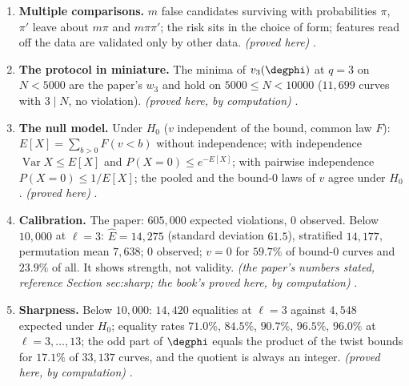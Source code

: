 \begin{enumerate}[label=\textbf{\thechapter.\arabic*}]
fixed before the hold-out counts of (eq:main) were seen; the Euler terms blind-tested only on the out-of-table curves; the weights $w_3$ only on the out-of-table curves, and only if these
contain curves with $3\mid N$ and potentially good reduction at $3$ (not stated); the correction $h_3$ and the III-free form never blind-tested. \emph{(a reading of the paper's text)}
.
\item \textbf{Multiple comparisons.} $m$ false candidates surviving with probabilities $\pi$, $\pi'$ leave about $m\pi$ and $m\pi\pi'$; the risk sits in the choice of
form; features read off the data are validated only by other data. \emph{(proved here)} .
\item \textbf{The protocol in miniature.} The minima of $v_3(\degphi)$ at $q=3$ on $N<5000$ are the paper's $w_3$ and hold on $5000\le N<10000$ ($11{,}699$ curves with $3\mid N$,
no violation). \emph{(proved here, by computation)} .
\item \textbf{The null model.} Under $H_0$ ($v$ independent of the bound, common law $F$): $E[X]=\sum_{b>0}F(v<b)$ without independence; with independence
$\operatorname{Var}X\le E[X]$ and $P(X=0)\le e^{-E[X]}$; with pairwise independence $P(X=0)\le1/E[X]$; the pooled and the bound-$0$ laws of $v$ agree under $H_0$.
\emph{(proved here)} .
\item \textbf{Calibration.} The paper: $605{,}000$ expected violations, $0$ observed. Below $10{,}000$ at $\ell=3$: $\hat E=14{,}275$ (standard deviation $61.5$), stratified
$14{,}177$, permutation mean $7{,}638$; $0$ observed; $v=0$ for $59.7\%$ of bound-$0$ curves and $23.9\%$ of all. It shows strength, not validity.
\emph{(the paper's numbers stated, reference Section sec:sharp; the book's proved here, by computation)}
.
\item \textbf{Sharpness.} Below $10{,}000$: $14{,}420$ equalities at $\ell=3$ against $4{,}548$ expected under $H_0$; equality rates $71.0\%$, $84.5\%$, $90.7\%$, $96.5\%$, $96.0\%$ at
$\ell=3,\dots,13$; the odd part of $\degphi$ equals the product of the twist bounds for $17.1\%$ of $33{,}137$ curves, and the quotient is always an integer.
\emph{(proved here, by computation)} .

\end{enumerate}
